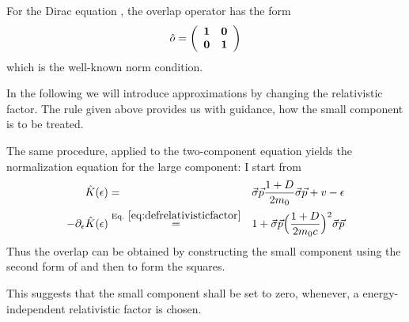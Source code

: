 \documentclass[11pt,a4paper]{report}
\begin{document}
For the Dirac equation , the overlap
operator has the form
\begin{eqnarray}
\hat{o}=\left(\begin{array}{cc}\bm{1}&\bm{0}\\
\bm{0}&\bm{1}\end{array}\right)
\end{eqnarray}
which is the well-known norm condition.

In the following we will introduce approximations by changing the
relativistic factor. The rule given above provides us with guidance,
how the small component is to be treated.

The same procedure, applied to the two-component equation yields the
normalization equation for the large component: I start from
\begin{eqnarray}
\hat{K}(\epsilon)&=&
\vec{\sigma}\vec{p} \frac{1+D}{2m_0}
\vec{\sigma}\vec{p} +v-\epsilon
\nonumber\\
-\partial_\epsilon\hat{K}(\epsilon)&\eqrel{eq:defrelativisticfactor}{=}&
1+
\vec{\sigma}\vec{p} \Bigl(\frac{1+D}{2m_0c}\Bigr)^2
\vec{\sigma}\vec{p}
\end{eqnarray}
Thus the overlap can be obtained by constructing the small component
using the second form of  and then to form
the squares.

This suggests that the small component shall be set to zero, whenever,
a energy-independent relativistic factor is chosen.  

\end{document}

